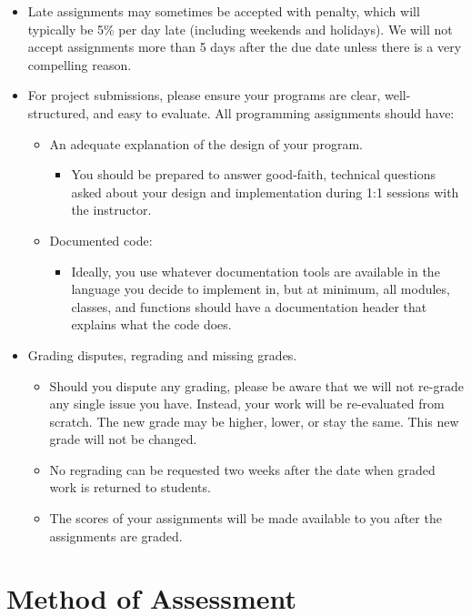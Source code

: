 \documentclass[11pt,article,oneside]{memoir} %
\begin{document}
\begin{itemize}
    \item Late assignments may sometimes be accepted with penalty, which will typically be 5\%
    per day late (including weekends and holidays). We will not accept assignments more
    than 5 days after the due date unless there is a very compelling reason.
    \item For project submissions, please ensure your programs are clear, well-structured, and easy to evaluate.
    All programming assignments should have:
    \begin{itemize}
        \item An adequate explanation of the design of your program.
        \begin{itemize}
            \item You should be prepared to answer good-faith, technical questions asked about
            your design and implementation during 1:1 sessions with the instructor.
        \end{itemize}
        \item Documented code:
        \begin{itemize}
            \item Ideally, you use whatever documentation tools are available in the language you
            decide to implement in, but at minimum, all modules, classes, and functions
            should have a documentation header that explains what the code does.
        \end{itemize}
    \end{itemize}
    \item Grading disputes, regrading and missing grades.
    \begin{itemize}
        \item Should you dispute any grading, please be aware that we will not re-grade any
single issue you have. Instead, your work will be re-evaluated from scratch. The
new grade may be higher, lower, or stay the same. This new grade will not be
changed.
        \item No regrading can be requested two weeks after the date when graded work is
        returned to students.
        \item The scores of your assignments will be made available to you after the
assignments are graded.
    \end{itemize}
\end{itemize}

\section{Method of Assessment}%
\end{document}
